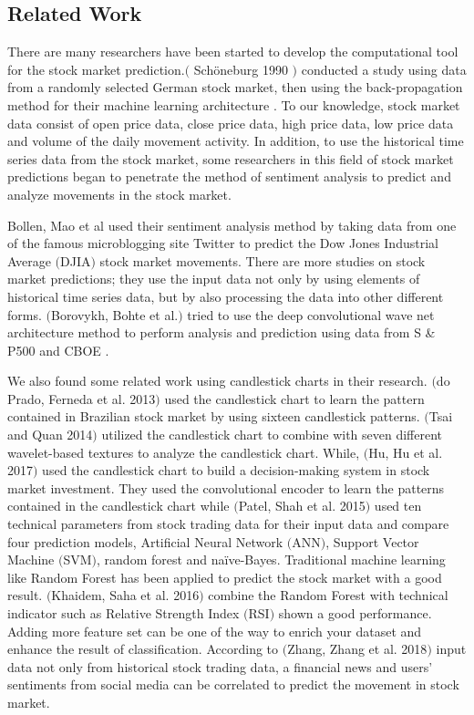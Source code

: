 \documentclass[10pt,twocolumn]{article}
\begin{document}
\subsection{Related Work}
There are many researchers have been started to develop the computational tool for the stock market prediction.$($ Schöneburg 1990 $)$ conducted a study using data from a randomly selected German stock market, then using the back-propagation method for their machine learning architecture \cite{schoneburg1990stock}. To our knowledge, stock market data consist of open price data, close price data, high price data, low price data and volume of the daily movement activity. In addition, to use the historical time series data from the stock market, some researchers in this field of stock market predictions began to penetrate the method of sentiment analysis to predict and analyze movements in the stock market.
\par
Bollen, Mao et al used their sentiment analysis method by taking data from one of the famous microblogging site Twitter to predict the Dow Jones Industrial Average $($DJIA$)$ stock market movements\cite{bollen2011twitter}. There are more studies on stock market predictions; they use the input data not only by using elements of historical time series data, but by also processing the data into other different forms. $($Borovykh, Bohte et al.$)$ tried to use the deep convolutional wave net architecture method to perform analysis and prediction using data from S \& P500 and CBOE \cite{borovykhdilated}.
\par
We also found some related work using candlestick charts in their research. $($do Prado, Ferneda et al. 2013$)$ used the candlestick chart to learn the pattern contained in Brazilian stock market by using sixteen candlestick patterns\cite{do2013effectiveness}. $($Tsai and Quan 2014$)$ utilized the candlestick chart to combine with seven different wavelet-based textures to analyze the candlestick chart\cite{tsai2014stock}. While,  $($Hu, Hu et al. 2017$)$ used the candlestick chart to build a decision-making system in stock market investment. They used the convolutional encoder to learn the patterns contained in the candlestick chart\cite{hu2017deep} while 
$($Patel, Shah et al. 2015$)$ used ten technical parameters from stock trading data for their input data and compare four prediction models, Artificial Neural Network $($ANN$)$, Support Vector Machine $($SVM$)$, random forest and naïve-Bayes\cite{patel2015predicting}. Traditional machine learning like Random Forest has been applied to predict the stock market with a good result. $($Khaidem, Saha et al. 2016$)$ combine the Random Forest with technical indicator such as Relative Strength Index $($RSI$)$ shown a good performance\cite{khaidem2016predicting}. Adding more feature set can be one of the way to enrich your dataset and enhance the result of classification. According to $($Zhang, Zhang et al. 2018$)$ input data not only from historical stock trading data, a financial news and users’ sentiments from social media can be correlated to predict the movement in stock market\cite{zhang2018improving}.
\end{document}
